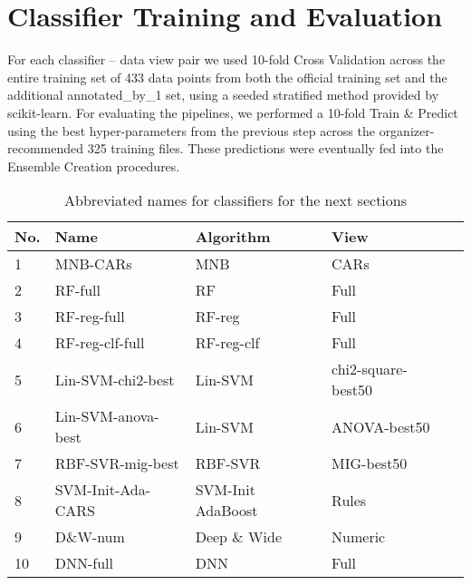 \section{Classifier Training and Evaluation}

For each classifier -- data view pair
we used 10-fold Cross Validation across the entire training set of 433 data points
from both the official training set and the additional \textsf{annotated\_by\_1}
set, using a seeded stratified method provided by \textsf{scikit-learn}. For evaluating the pipelines, we performed a 10-fold Train \& Predict using the best hyper-parameters from the previous step across the organizer-recommended 325 training files. These predictions were eventually fed into the Ensemble Creation procedures. 


\begin{table}[]
    \centering
    \begin{tabular}{|l|l|l|l|l|}
    \hline
    \textsf{No.} & \textsf{Name} & \textsf{Algorithm} & \textsf{View} \\
    \hline
    1 & \textsf{MNB-CARs} & \textsf{MNB} & \textsf{CARs} \\
    2 & \textsf{RF-full} & \textsf{RF} & \textsf{Full} \\
    3 & \textsf{RF-reg-full} & \textsf{RF-reg} & \textsf{Full} \\
    4 & \textsf{RF-reg-clf-full} & \textsf{RF-reg-clf} & \textsf{Full} \\
    5 & \textsf{Lin-SVM-chi2-best} & \textsf{Lin-SVM} & \textsf{chi2-square-best50} \\
    6 & \textsf{Lin-SVM-anova-best} & \textsf{Lin-SVM} & \textsf{ANOVA-best50} \\
    7 & \textsf{RBF-SVR-mig-best} & \textsf{RBF-SVR} & \textsf{MIG-best50} \\
    8 & \textsf{SVM-Init-Ada-CARS} & \textsf{SVM-Init AdaBoost} & \textsf{Rules} \\
    9 & \textsf{D\&W-num} & \textsf{Deep \& Wide} & \textsf{Numeric} \\
    10 & \textsf{DNN-full} & \textsf{DNN} & \textsf{Full} \\
    \hline
    \end{tabular}
    \caption{Abbreviated names for classifiers for the next sections}
    \label{tab:Best6ClassifierNames}
    
\end{table}

